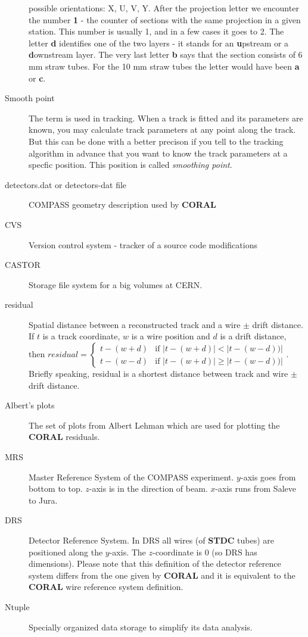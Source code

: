 \documentclass[a4paper,12pt]{article}
\begin{document}
\begin{description}
        possible orientations: X, U, V, Y. After the projection letter we encounter the number
        {\bf 1} - the counter of sections with the same projection in a given station.
        This number is usually 1, and in a few cases it goes to 2.
        The letter {\bf d} identifies one of the two layers - it stands for an
        {\bf u}pstream or a {\bf d}ownstream layer. The very last letter {\bf b}
        says that the section
        consists of 6 mm straw tubes. For the 10 mm straw tubes the letter would have been
        {\bf a} or {\bf c}.
\item[Smooth point] The term is used in tracking. When a track is fitted and its parameters
        are known, you may calculate track parameters at any point along the track. But this can
        be done with a better precison if you tell to the tracking algorithm in advance that you want
        to know the track parameters at a specfic position. This position is called {\it smoothing point}.
\item[detectors.dat or detectors-dat file] COMPASS geometry description used by {\bf CORAL}
\item[CVS] Version control system - tracker of a source code modifications
\item[CASTOR] Storage file system for a big volumes at CERN.
\item[residual] Spatial distance between a reconstructed track and a wire $\pm$ drift distance.
      If $t$ is a track coordinate, $w$ is a wire position and $d$ is a drift distance, then
      $residual = \left\{
        \begin{array}{ll}
            t-(w+d) & \mbox{if  } |t-(w+d)|<|t-(w-d))| \\
            t-(w-d) & \mbox{if  } |t-(w+d)|\geq|t-(w-d))|
        \end{array}
        \right. .
      $
      Briefly speaking, residual is a shortest distance between track and wire $\pm$ drift distance.
\item[Albert's plots] The set of plots from Albert Lehman which are used for plotting the {\bf CORAL} residuals.
\item[MRS] Master Reference System of the COMPASS experiment. $y$-axis goes from bottom to top.
         $z$-axis is in the direction of beam. $x$-axis runs from Saleve to Jura.
\item[DRS] Detector Reference System. In DRS all wires (of {\bf STDC} tubes) are positioned along the $y$-axis.
         The $z$-coordinate is 0 (so DRS has dimensions). Please note that this definition of the detector 
         reference system differs from the one given by {\bf CORAL} and it is equivalent to the {\bf CORAL} wire 
         reference system definition.
\item[Ntuple] Specially organized data storage to simplify its data analysis.
\end{description}
\end{document}
